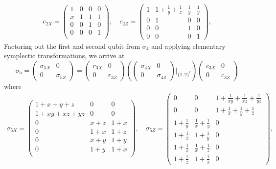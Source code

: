 \begin{align*}
c_{2X} =
\begin{pmatrix}
 1 & 0 & 0 & 0 \\
 x & 1 & 1 & 1 \\
 0 & 0 & 1 & 0 \\
 0 & 0 & 0 & 1 \\
\end{pmatrix}, \quad
c_{2Z} =
\begin{pmatrix}
 1 & 1+\frac{1}{y}+\frac{1}{z} & \frac{1}{y} & \frac{1}{y} \\
 0 & 1 & 0 & 0 \\
 0 & 0 & 1 & 0 \\
 0 & 0 & 0 & 1
\end{pmatrix},
\end{align*}
Factoring out the first and second qubit from $\sigma_4$
and applying elementary symplectic transformations,
we arrive at
\[
 \sigma_5 = 
\begin{pmatrix} \sigma_{5X} & 0 \\ 0 & \sigma_{5Z} \end{pmatrix}
=
\begin{pmatrix} r_{3X} & 0 \\ 0 & r_{3Z} \end{pmatrix}
\left( \begin{pmatrix} \sigma_{4X} & 0 \\ 0 & \sigma_{4Z} \end{pmatrix} \rvert_{\{1,2\}^c} \right)
\begin{pmatrix} c_{3X} & 0 \\ 0 & c_{3Z} \end{pmatrix}
\]
where
\begin{align*}
\sigma_{5X} =
\begin{pmatrix}
 1+x+y+z & 0 & 0  \\
 1+x y+x z+y z & 0 & 0  \\
 0 & x+z & 1+x  \\
 0 & 1+x & 1+z  \\
 0 & x+y & 1+y  \\
 0 & 1+y & 1+x  \\
\end{pmatrix},
\quad
\sigma_{5Z} =
\begin{pmatrix}
 0 & 0 & 1+\frac{1}{x y}+\frac{1}{x z}+\frac{1}{y z} \\
 0 & 0 & 1+\frac{1}{x}+\frac{1}{y}+\frac{1}{z} \\
 1+\frac{1}{y} & \frac{1}{x}+\frac{1}{y} & 0 \\
 1+\frac{1}{x} & 1+\frac{1}{y} & 0 \\
 1+\frac{1}{x} & \frac{1}{x}+\frac{1}{z} & 0 \\
 1+\frac{1}{z} & 1+\frac{1}{x} & 0
\end{pmatrix},
\end{align*}
